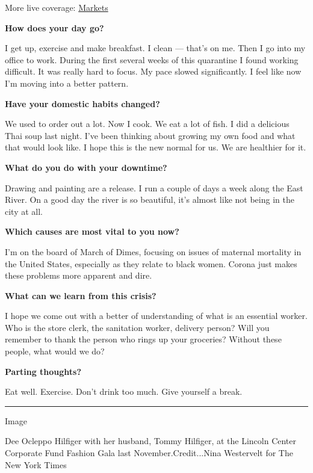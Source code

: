 More live coverage:
\href{https://www.nytimes.com/live/2020/08/04/business/stock-market-today-coronavirus?action=click\&pgtype=Article\&state=default\&region=MAIN_CONTENT_1\&context=storylines_live_updates}{Markets}

\textbf{How does your day go?}

I get up, exercise and make breakfast. I clean --- that's on me. Then I
go into my office to work. During the first several weeks of this
quarantine I found working difficult. It was really hard to focus. My
pace slowed significantly. I feel like now I'm moving into a better
pattern.

\textbf{Have your domestic habits changed?}

We used to order out a lot. Now I cook. We eat a lot of fish. I did a
delicious Thai soup last night. I've been thinking about growing my own
food and what that would look like. I hope this is the new normal for
us. We are healthier for it.

\textbf{What do you do with your downtime?}

Drawing and painting are a release. I run a couple of days a week along
the East River. On a good day the river is so beautiful, it's almost
like not being in the city at all.

\textbf{Which causes are most vital to you now?}

I'm on the board of March of Dimes, focusing on issues of maternal
mortality in the United States, especially as they relate to black
women. Corona just makes these problems more apparent and dire.

\textbf{What can we learn from this crisis?}

I hope we come out with a better of understanding of what is an
essential worker. Who is the store clerk, the sanitation worker,
delivery person? Will you remember to thank the person who rings up your
groceries? Without these people, what would we do?

\textbf{Parting thoughts?}

Eat well. Exercise. Don't drink too much. Give yourself a break.

\begin{center}\rule{0.5\linewidth}{\linethickness}\end{center}

Image

Dee Ocleppo Hilfiger with her husband, Tommy Hilfiger, at the Lincoln
Center Corporate Fund Fashion Gala last November.Credit...Nina
Westervelt for The New York Times

